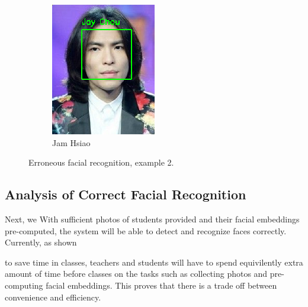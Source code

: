 \begin{figure}[!htb]
\begin{subfigure}[b]{0.3\linewidth}
    \includegraphics[width=\linewidth]{figures/false-recog-error2.png}
    \caption{Jam Hsiao}
  \end{subfigure}
  \caption{Erroneous facial recognition, example 2.}
  \label{fig:false-recog2}
\end{figure}
\vspace{0.5cm}


\subsection{Analysis of Correct Facial Recognition}
Next, we
With sufficient photos of students provided and their facial embeddings pre-computed,
the system will be able to detect and recognize faces correctly. Currently, as shown

to save time in classes, teachers and students will have to spend equivilently extra amount of time
before classes on the tasks such as collecting photos and pre-computing facial embeddings.
This proves that there is a trade off between convenience and efficiency.
\vspace{0.2cm}
